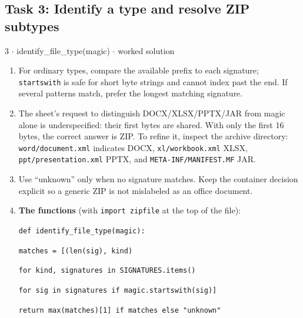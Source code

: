 \documentclass[11pt]{article}
\begin{document}
\begin{keepsection}\subsection{Task 3: Identify a type and resolve ZIP subtypes}

\begin{workedbox}{3 \ensuremath{\cdot} identify\_file\_type(magic) \ensuremath{\cdot} worked solution}
\begin{enumerate}
\item For ordinary types, compare the available prefix to each signature; \texttt{startswith} is safe for short byte strings and cannot index past the end. If several patterns match, prefer the longest matching signature.
\item The sheet’s request to distinguish DOCX/XLSX/PPTX/JAR from magic alone is underspecified: their first bytes are shared. With only the first 16 bytes, the correct answer is ZIP. To refine it, inspect the archive directory: \texttt{word/document.xml} indicates DOCX, \texttt{xl/workbook.xml} XLSX, \texttt{ppt/presentation.xml} PPTX, and \texttt{META-INF/MANIFEST.MF} JAR.
\item Use “unknown” only when no signature matches. Keep the container decision explicit so a generic ZIP is not mislabeled as an office document.
\item {}
\textbf{The functions} (with \texttt{import zipfile} at the top of the file):
\begin{tcolorbox}[colback=Paperblue,colframe=Paperblue,boxrule=0pt,arc=0pt,left=7pt,right=7pt,top=5pt,bottom=5pt]\small\sloppy
\noindent\hspace*{0em}\texttt{def identify\_file\_type(magic):}\par
\noindent\hspace*{1em}\texttt{matches = [(len(sig), kind)}\par
\noindent\hspace*{6em}\texttt{for kind, signatures in SIGNATURES.items()}\par
\noindent\hspace*{6em}\texttt{for sig in signatures if magic.startswith(sig)]}\par
\noindent\hspace*{1em}\texttt{return max(matches)[1] if matches else "unknown"}\par
\noindent\hspace*{0em}\texttt{}\par

\end{tcolorbox}
\end{enumerate}
\end{workedbox}
\end{keepsection}
\end{document}
